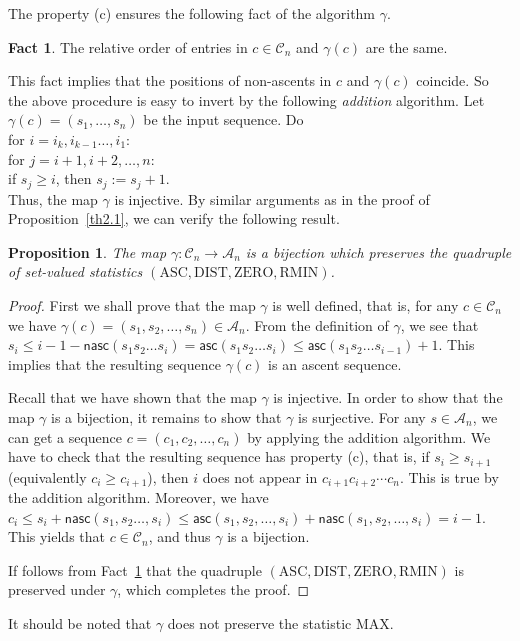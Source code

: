 \documentclass[12pt]{amsart}
\newcounter{mycount}
\theoremstyle{plain}
\newtheorem{proposition}[mycount]{Proposition}
\theoremstyle{definition}
\newtheorem{fact}{Fact}
\theoremstyle{example}
\theoremstyle{remark}
\numberwithin{equation}{section}
\numberwithin{figure}{section}
\newcommand{\asc}{\mathsf{asc}}
\def\nasc{\mathsf{nasc}}
\def\A{\mathcal{A}}
\def\DIST{\mathrm{DIST}}
\def\ASC{\mathrm{ASC}}
\def\RMIN{\mathrm{RMIN}}
\def\ZERO{\mathrm{ZERO}}
\def\MAX{\mathrm{MAX}}
\begin{document}
The property (c) ensures the following fact of the algorithm $\gamma$.
\begin{fact}\label{gam:fact}
The relative order of  entries in $c\in\mathcal{C}_n$ and $\gamma(c)$ are the same.
\end{fact}


   This fact implies that  the positions of non-ascents in $c$ and $\gamma(c)$ coincide. So  the above procedure is easy to invert by the following {\em addition} algorithm. Let $\gamma(c)=(s_1,\ldots,s_n)$ be the input sequence. Do\\
\hspace*{0.5cm}  for $i=i_k, i_{k-1}\ldots, i_1$:\\
\hspace*{1cm}  for $j=i+1, i+2, \ldots, n$:\\
 \hspace*{1.5cm}  if  $s_j\geq i$, then $s_j:=s_j+1$.\\
Thus, the map $\gamma$ is injective.
By similar arguments as in the proof of Proposition~\ref{th2.1}, we can verify the following result.
\begin{proposition}\label{gam:th1}
The map $\gamma: \mathcal{C}_n\rightarrow\mathcal{A}_n$ is a bijection which preserves the quadruple  of set-valued statistics
$(\ASC,\DIST,\ZERO,\RMIN)$.
\end{proposition}
\begin{proof}
 First we shall prove that the map $\gamma$ is well defined, that is, for any $c\in\mathcal{C}_n$ we have $\gamma(c)=(s_1,s_2,\ldots, s_n)\in \A_n$. From  the definition of $\gamma$, we see that $s_i\leq i-1-\nasc(s_1s_2\ldots s_{i})=\asc(s_1s_2\ldots s_i)\leq \asc(s_1s_2\ldots s_{i-1})+1$. This implies that the resulting sequence $\gamma(c)$ is an ascent sequence.


 Recall that we have shown that the map $\gamma$  is injective. In order to show that the map $\gamma$ is a bijection, it remains to show that $\gamma$ is surjective.  For any $s\in \A_n$, we can  get a sequence $c=(c_1,c_2,\ldots, c_n)$ by applying the addition algorithm.
 We have to check that the resulting sequence has property (c), that is, if $s_i\geq s_{i+1}$ (equivalently $c_i\geq c_{i+1}$), then $i$ does not appear in $c_{i+1}c_{i+2}\cdots c_n$. This is true by the addition algorithm.
 Moreover, we have $c_i\leq s_i+\nasc(s_1,s_2\ldots, s_{i})\leq \asc(s_1,s_2,\ldots, s_{i})+\nasc(s_1,s_2,\ldots, s_{i})=i-1$.  This yields that $c\in \mathcal{C}_n$, and thus $\gamma$ is a bijection.

If follows from Fact~\ref{gam:fact} that the quadruple $(\ASC,\DIST,\ZERO,\RMIN)$ is preserved under $\gamma$, which completes the proof.
\end{proof}
It should be noted that $\gamma$ does not preserve the statistic $\MAX$.
\end{document}
